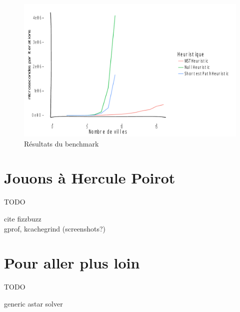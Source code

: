 \documentclass[french]{article}
\begin{document}
\begin{figure}
	\centering
	\includegraphics[scale=0.8]{graphs/benchmarks.pdf}
	\caption{Résultats du benchmark}
	\label{fig:benchmarks}
\end{figure}

\part{Jouons à Hercule Poirot}

{\Huge TODO}

cite fizzbuzz\\
gprof, kcachegrind (screenshots?)

\part{Pour aller plus loin}

{\Huge TODO}

generic astar solver

\printbibliography%
\end{document}
